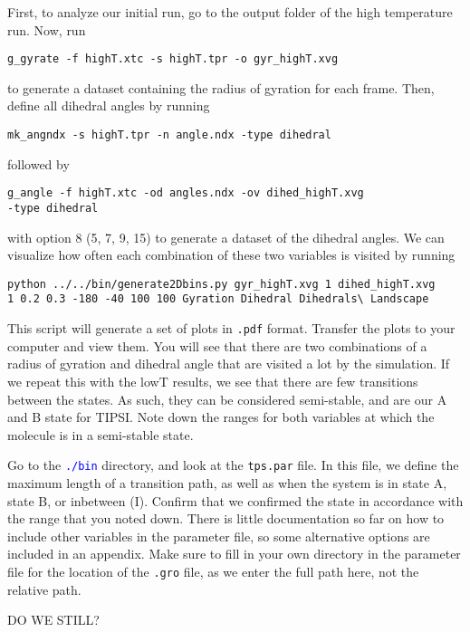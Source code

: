 \documentclass[]{article}
\begin{document}
First, to analyze our initial run, go to the output folder of the high temperature run. Now, run
%
\begin{lstlisting}
g_gyrate -f highT.xtc -s highT.tpr -o gyr_highT.xvg
\end{lstlisting}
%
to generate a dataset containing the radius of gyration for each frame. Then, define all dihedral angles by running
%
\begin{lstlisting}
mk_angndx -s highT.tpr -n angle.ndx -type dihedral
\end{lstlisting}
%
followed by
%
\begin{lstlisting}
g_angle -f highT.xtc -od angles.ndx -ov dihed_highT.xvg 
-type dihedral
\end{lstlisting}
%
with option 8 (5, 7, 9, 15) to generate a dataset of the dihedral angles. We can visualize how often each combination of these two variables is visited by running
%
\begin{lstlisting}
python ../../bin/generate2Dbins.py gyr_highT.xvg 1 dihed_highT.xvg 
1 0.2 0.3 -180 -40 100 100 Gyration Dihedral Dihedrals\ Landscape
\end{lstlisting}
%
This script will generate a set of plots in \texttt{.pdf} format. Transfer the plots to your computer and view them. You will see that there are two combinations of a radius of gyration and dihedral angle that are visited a lot by the simulation. If we repeat this with the lowT results, we see that there are few transitions between the states. As such, they can be considered semi-stable, and are our A and B state for \textsc{TIPSI}. Note down the ranges for both variables at which the molecule is in a semi-stable state.

Go to the \textcolor{blue}{\texttt{./bin}} directory, and look at the \texttt{tps.par} file. In this file, we define the maximum length of a transition path, as well as when the system is in state A, state B, or inbetween (I). Confirm that we confirmed the state in accordance with the range that you noted down. There is little documentation so far on how to include other variables in the parameter file, so some alternative options are included in an appendix. Make sure to fill in your own directory in the parameter file for the location of the \texttt{.gro} file, as we enter the full path here, not the relative path.

DO WE STILL?
\end{document}
